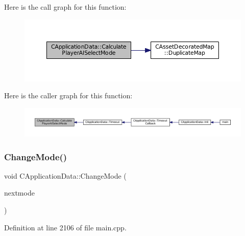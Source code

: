 Here is the call graph for this function\+:\nopagebreak
\begin{figure}[H]
\begin{center}
\leavevmode
\includegraphics[width=350pt]{classCApplicationData_afbd3d397ba6bb36452458cf8f62ef9dc_cgraph}
\end{center}
\end{figure}
Here is the caller graph for this function\+:\nopagebreak
\begin{figure}[H]
\begin{center}
\leavevmode
\includegraphics[width=350pt]{classCApplicationData_afbd3d397ba6bb36452458cf8f62ef9dc_icgraph}
\end{center}
\end{figure}
\hypertarget{classCApplicationData_aee18c113e9a0acb3cad3d63eb19de71b}{}\label{classCApplicationData_aee18c113e9a0acb3cad3d63eb19de71b} 
\subsubsection{\texorpdfstring{Change\+Mode()}{ChangeMode()}}
{\footnotesize\ttfamily void C\+Application\+Data\+::\+Change\+Mode (\begin{DoxyParamCaption}\item[{\hyperlink{classCApplicationData_ac8ac37a4c8bb871036fbbdc6a072e403}{E\+Game\+Mode}}]{nextmode }\end{DoxyParamCaption})\hspace{0.3cm}{\ttfamily [protected]}}



Definition at line 2106 of file main.\+cpp.


